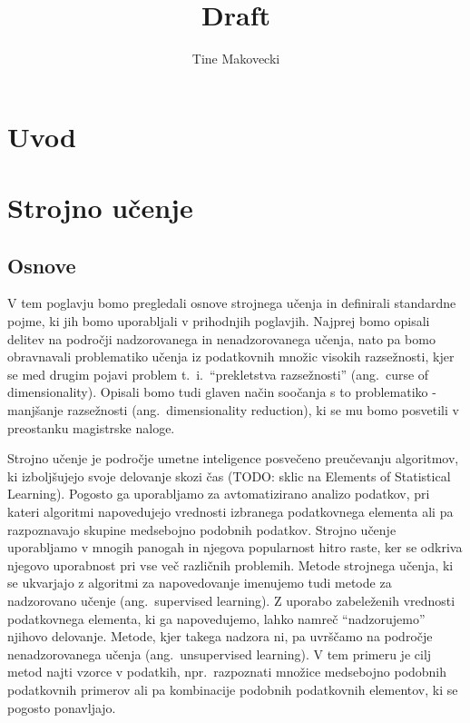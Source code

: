 \documentclass[12pt,a4paper]{article}
\author{Tine Makovecki}
\begin{document}
\title{\LARGE{Draft}}
\maketitle



\section{Uvod}


\section{Strojno učenje}


\subsection{Osnove}

V tem poglavju bomo pregledali osnove strojnega učenja in definirali standardne pojme, ki jih bomo uporabljali v prihodnjih poglavjih. 
Najprej bomo opisali delitev na področji nadzorovanega in nenadzorovanega učenja, 
nato pa bomo obravnavali problematiko učenja iz podatkovnih množic visokih razsežnosti, 
kjer se med drugim pojavi problem t.~i.~``prekletstva razsežnosti'' (ang.~curse of dimensionality). 
Opisali bomo tudi glaven način soočanja s to problematiko - manjšanje razsežnosti (ang.~dimensionality reduction), ki se mu bomo posvetili v preostanku magistrske naloge.

Strojno učenje je področje umetne inteligence posvečeno preučevanju algoritmov, 
ki izboljšujejo svoje delovanje skozi čas (TODO: sklic na Elements of Statistical Learning). 
Pogosto ga uporabljamo za avtomatizirano analizo podatkov, pri kateri algoritmi napovedujejo vrednosti izbranega podatkovnega elementa ali pa razpoznavajo skupine medsebojno podobnih podatkov. 
Strojno učenje uporabljamo v mnogih panogah in njegova popularnost hitro raste, ker se odkriva njegovo uporabnost pri vse več različnih problemih. 
Metode strojnega učenja, ki se ukvarjajo z algoritmi za napovedovanje imenujemo tudi metode za nadzorovano učenje (ang.~supervised learning). 
Z uporabo zabeleženih vrednosti podatkovnega elementa, ki ga napovedujemo, lahko namreč ``nadzorujemo'' njihovo delovanje. 
Metode, kjer takega nadzora ni, pa uvrščamo na področje nenadzorovanega učenja (ang.~unsupervised learning). 
V tem primeru je cilj metod najti vzorce v podatkih, npr.\ razpoznati množice medsebojno podobnih podatkovnih primerov ali pa kombinacije podobnih podatkovnih elementov, ki se pogosto ponavljajo.
\end{document}
